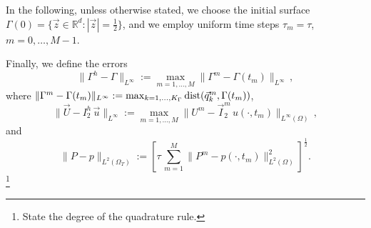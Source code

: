 \documentclass[a4paper,12pt,onecolumn]{article}
\newcommand{\R}{{\mathbb R}}
\newcommand{\errorXx}{\|\Gamma^h - \Gamma\|_{L^\infty}}
\newcommand{\errorUu}[1]{\|\vec U - I^h_{#1}\,\vec u\|_{L^\infty}}
\newcommand{\LerrorPp}{\|P - p\|_{L^2(\Omega_T)}}
\begin{document}
In the following, unless otherwise stated, we choose the initial surface 
$\Gamma(0) = \{ \vec z \in \R^d : |\vec z| = \frac12 \}$, and we employ 
uniform time steps $\tau_m=\tau$, $m=0,\ldots, M-1$.

Finally, we define the errors 
\begin{equation} \label{eq:errorXx}
\errorXx := \max_{m=1,\ldots, M} \|\Gamma^m - \Gamma(t_m)\|_{L^\infty}\,, 
\end{equation}
where $\|\Gamma^m - \Gamma(t_m)\|_{L^\infty} := 
\max_{k=1,\ldots, K_\Gamma} {\rm dist}( \vec{q}^m_k, \Gamma(t_m))$,
\begin{equation*} 
\errorUu2 := \max_{m=1,\ldots, M}\|U^m - \vec I^m_2\,u(\cdot,t_m)\|_{L^\infty(\Omega)}\,, 
\end{equation*}
and
\begin{equation*}
\LerrorPp := \left[\tau\,\sum_{m=1}^M \|P^m - p(\cdot,t_m)\|_{L^2(\Omega)}^2 
\right]^\frac12 .
\end{equation*}
\footnote{State the degree of the quadrature rule.}
\end{document}
